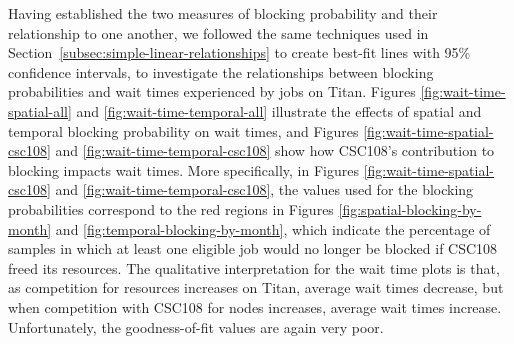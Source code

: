 
Having established the two measures of blocking probability and their
relationship to one another, we followed the same techniques used in
Section~\ref{subsec:simple-linear-relationships} to create best-fit lines with
95\% confidence intervals, to investigate the relationships between blocking
probabilities and wait times experienced by jobs on Titan. Figures
\ref{fig:wait-time-spatial-all} and \ref{fig:wait-time-temporal-all} illustrate
the effects of spatial and temporal blocking probability on wait times, and
Figures \ref{fig:wait-time-spatial-csc108} and
\ref{fig:wait-time-temporal-csc108} show how CSC108's contribution to blocking
impacts wait times. More specifically, in Figures
\ref{fig:wait-time-spatial-csc108} and \ref{fig:wait-time-temporal-csc108}, the
values used for the blocking probabilities correspond to the red regions in
Figures \ref{fig:spatial-blocking-by-month} and
\ref{fig:temporal-blocking-by-month}, which indicate the percentage of samples
in which at least one eligible job would no longer be blocked if CSC108 freed
its resources. The qualitative interpretation for the wait time plots is that,
as competition for resources increases on Titan, average wait times decrease,
but when competition with CSC108 for nodes increases, average wait times
increase. Unfortunately, the goodness-of-fit values are again very poor.


